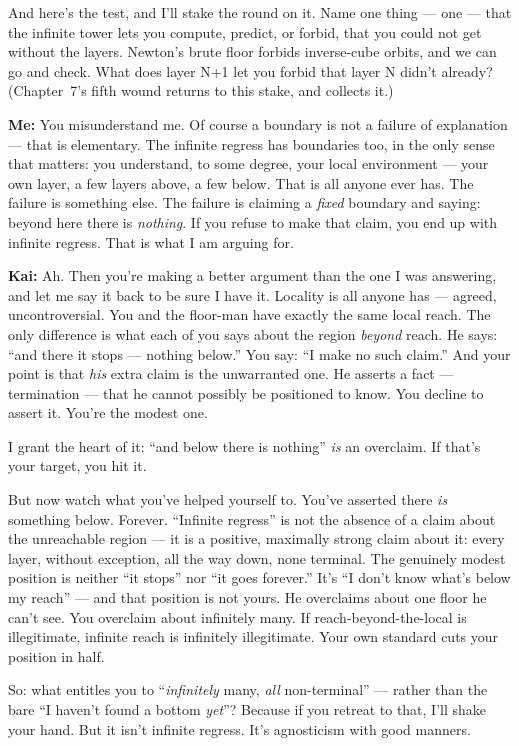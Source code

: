 \documentclass[fontsize=11pt,paper=a4,pagesize=auto,parskip=half-]{scrbook}
\newcommand{\Iy}[1]{#1\index{#1}}
\newcommand{\speaker}[1]{\par\noindent\textbf{#1:}\hspace{0.6em}}
\begin{document}
And here's the test, and I'll stake the round on it. Name one thing --- one --- that the infinite tower lets you compute, predict, or forbid, that you could not get without the layers. \Iy{Newton}'s brute floor forbids inverse-cube orbits, and we can go and check. What does layer N+1 let you forbid that layer N didn't already? (Chapter~7's fifth wound returns to this stake, and collects it.)

\speaker{Me} You misunderstand me. Of course a boundary is not a failure of explanation --- that is elementary. The infinite regress has boundaries too, in the only sense that matters: you understand, to some degree, your local environment --- your own layer, a few layers above, a few below. That is all anyone ever has. The failure is something else. The failure is claiming a \emph{fixed} boundary and saying: beyond here there is \emph{nothing}. If you refuse to make that claim, you end up with infinite regress. That is what I am arguing for.

\speaker{Kai} Ah. Then you're making a better argument than the one I was answering, and let me say it back to be sure I have it. Locality is all anyone has --- agreed, uncontroversial. You and the floor-man have exactly the same local reach. The only difference is what each of you says about the region \emph{beyond} reach. He says: ``and there it stops --- nothing below.'' You say: ``I make no such claim.'' And your point is that \emph{his} extra claim is the unwarranted one. He asserts a fact --- termination --- that he cannot possibly be positioned to know. You decline to assert it. You're the modest one.

I grant the heart of it: ``and below there is nothing'' \emph{is} an overclaim. If that's your target, you hit it.

But now watch what you've helped yourself to. You've asserted there \emph{is} something below. Forever. ``Infinite regress'' is not the absence of a claim about the unreachable region --- it is a positive, maximally strong claim about it: every layer, without exception, all the way down, none terminal. The genuinely modest position is neither ``it stops'' nor ``it goes forever.'' It's ``I don't know what's below my reach'' --- and that position is not yours. He overclaims about one floor he can't see. You overclaim about infinitely many. If reach-beyond-the-local is illegitimate, infinite reach is infinitely illegitimate. Your own standard cuts your position in half.

So: what entitles you to ``\emph{infinitely} many, \emph{all} non-terminal'' --- rather than the bare ``I haven't found a bottom \emph{yet}''? Because if you retreat to that, I'll shake your hand. But it isn't infinite regress. It's agnosticism with good manners.
\end{document}
